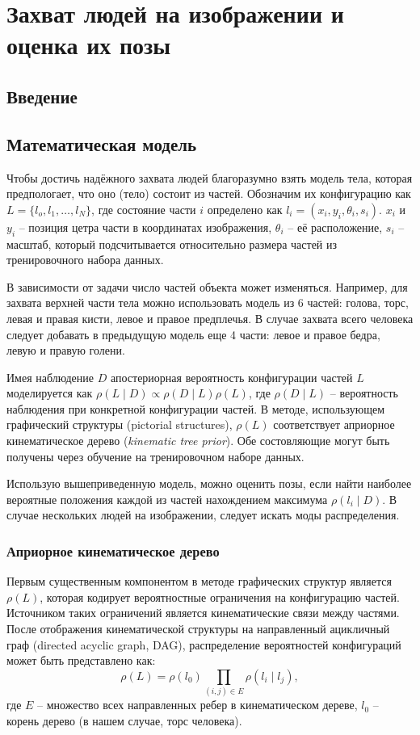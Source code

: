 \section{Захват людей на изображении и оценка их позы}

\subsection{Введение}
\subsection{Математическая модель}

Чтобы достичь надёжного захвата людей благоразумно взять модель тела, которая предпологает, что оно (тело) состоит из частей. Обозначим их конфигурацию как \(L = \{l_o, l_1, \dots, l_N\}\), где состояние части \(i\) определено как \(l_i = (x_i, y_i, \theta_i, s_i)\). \(x_i\) и \(y_i\) -- позиция цетра части в координатах изображения, \(\theta_i\) -- её расположение, \(s_i\) -- масштаб, который подсчитывается относительно размера частей из тренировочного набора данных.

В зависимости от задачи число частей объекта может изменяться. Например, для захвата верхней части тела можно использовать модель из 6 частей: голова, торс, левая и правая кисти, левое и правое предплечья. В случае захвата всего человека следует добавать в предыдущую модель еще 4 части: левое и правое бедра, левую и правую голени.

Имея наблюдение \(D\) апостериорная вероятность конфигурации частей \(L\) моделируется как \(\rho(L{\mid}D)\propto\rho(D{\mid}L)\rho(L)\), где \(\rho(D{\mid}L)\) -- вероятность наблюдения при конкретной конфигурации частей. В методе, использующем графический структуры (pictorial structures), \(\rho(L)\) соответствует априорное кинематическое дерево (\emph{kinematic tree prior}). Обе состовляющие могут быть получены через обучение на тренировочном наборе данных.

Использую вышеприведенную модель, можно оценить позы, если найти наиболее вероятные положения каждой из частей нахождением максимума \(\rho(l_i{\mid}D)\). В случае нескольких людей на изображении, следует искать моды распределения.

\subsubsection{Априорное кинематическое дерево}

Первым существенным компонентом в методе графических структур является \(\rho(L)\), которая кодирует вероятностные ограничения на конфигурацию частей. Источником таких ограничений является кинематические связи между частями. После отображения кинематической структуры на направленный ацикличный граф (directed acyclic graph, DAG), распределение вероятностей конфигураций может быть представлено как:
\begin{equation}
  \rho(L) = \rho(l_0)\prod_{(i,j){\in}E}\rho(l_i{\mid}l_j),
\end{equation}
где \(E\) -- множество всех направленных ребер в кинематическом дереве, \(l_0\) -- корень дерево (в нашем случае, торс человека).

